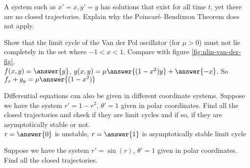 \documentclass{ximera}
\begin{document}
\begin{exercise}
    A system such as $x'=x, y'=y$ has solutions that exist for all time $t$, yet there are no closed trajectories.  Explain why the Poincar\'e--Bendixson Theorem does not apply.
\end{exercise}

\begin{exercise}%
    Show that the limit cycle of the  Van der Pol oscillator (for $\mu > 0$) must not lie completely in the set where $-1 < x < 1$. Compare with figure \ref{fig:nlin-van-der-fig}.\\
    $f(x,y) = \answer{y}$, $g(x,y) = \mu\answer{(1 - x^2)y} + \answer{-x}$.  So $f_x + g_y = \mu\answer{(1-x^2)}$
\end{exercise}

\begin{exercise}
    Differential equations can also be given in different coordinate systems. Suppose we have the system $r' = 1-r^2$, $\theta' = 1$ given in polar coordinates.  Find all the closed trajectories and check if they are limit cycles and if so, if they are asymptotically stable or not. \\
    $r = \answer{0}$ is unstable, $r = \answer{1}$ is asymptotically stable limit cycle
\end{exercise}

\begin{exercise}%
    Suppose we have the system $r' = \sin(r)$, $\theta' = 1$ given in polar coordinates.  Find all the closed trajectories.
\end{exercise}


%
\end{document}

